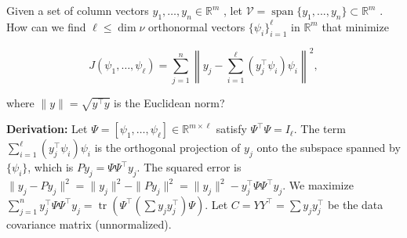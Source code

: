 \begin{exercise}
\label{applied:2025:4}
Given a set of column vectors $y _ { 1 } , \ldots , y _ { n } \in \mathbb { R } ^ { m }$ , let $\mathcal { V } = \operatorname { s p a n } \{ y _ { 1 } , . . . , y _ { n } \} \subset \mathbb { R } ^ { m }$ . How can we find $\ell \leq \dim \nu$ orthonormal vectors $\{ \psi _ { i } \} _ { i = 1 } ^ { \ell }$ in $\mathbb { R } ^ { m }$ that minimize

\[
J (\psi_ {1}, \ldots , \psi_ {\ell}) = \sum_ {j = 1} ^ {n} \left\| y _ {j} - \sum_ {i = 1} ^ {\ell} (y _ {j} ^ {\top} \psi_ {i}) \psi_ {i} \right\| ^ {2},
\]

where $\| y \| = \sqrt { y ^ { \top } y }$ is the Euclidean norm?
\end{exercise}

\begin{solution}
\textbf{Derivation:}
Let $\Psi = [\psi_1, \dots, \psi_\ell] \in \mathbb{R}^{m \times \ell}$ satisfy $\Psi^\top \Psi = I_\ell$. The term $\sum_{i=1}^\ell (y_j^\top \psi_i) \psi_i$ is the orthogonal projection of $y_j$ onto the subspace spanned by $\{\psi_i\}$, which is $P y_j = \Psi \Psi^\top y_j$.
The squared error is $\|y_j - P y_j\|^2 = \|y_j\|^2 - \|P y_j\|^2 = \|y_j\|^2 - y_j^\top \Psi \Psi^\top y_j$.
We maximize $\sum_{j=1}^n y_j^\top \Psi \Psi^\top y_j = \operatorname{tr}(\Psi^\top (\sum y_j y_j^\top) \Psi)$.
Let $C = YY^\top = \sum y_j y_j^\top$ be the data covariance matrix (unnormalized).

\end{solution}
